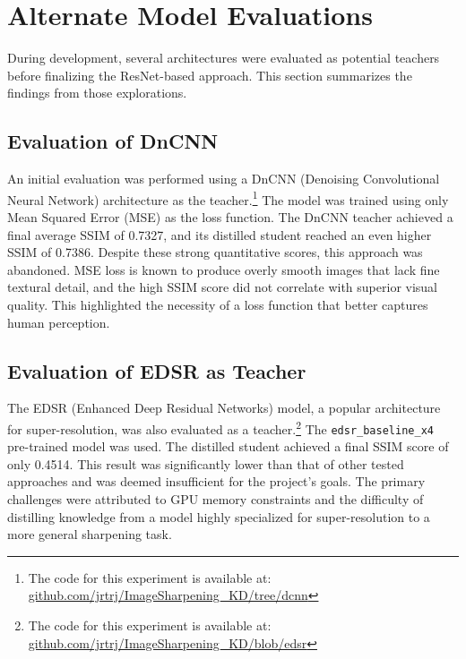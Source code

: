 \documentclass[12pt,a4paper]{article}
\begin{document}
\newpage
\section{Alternate Model Evaluations}
During development, several architectures were evaluated as potential teachers before finalizing the ResNet-based approach. This section summarizes the findings from those explorations.

\subsection{Evaluation of DnCNN}
An initial evaluation was performed using a DnCNN (Denoising Convolutional Neural Network) architecture as the teacher.\footnote{The code for this experiment is available at: \href{https://github.com/jrtrj/ImageSharpening_KD/tree/dcnn}{github.com/jrtrj/ImageSharpening\_KD/tree/dcnn}} The model was trained using only Mean Squared Error (MSE) as the loss function. The DnCNN teacher achieved a final average SSIM of 0.7327, and its distilled student reached an even higher SSIM of 0.7386. Despite these strong quantitative scores, this approach was abandoned. MSE loss is known to produce overly smooth images that lack fine textural detail, and the high SSIM score did not correlate with superior visual quality. This highlighted the necessity of a loss function that better captures human perception.

\subsection{Evaluation of EDSR as Teacher}
The EDSR (Enhanced Deep Residual Networks) model, a popular architecture for super-resolution, was also evaluated as a teacher.\footnote{The code for this experiment is available at: \href{https://github.com/jrtrj/ImageSharpening_KD/blob/edsr/image_sharpening_using_edsr.ipynb}{github.com/jrtrj/ImageSharpening\_KD/blob/edsr}} The \texttt{edsr\_baseline\_x4} pre-trained model was used. The distilled student achieved a final SSIM score of only 0.4514. This result was significantly lower than that of other tested approaches and was deemed insufficient for the project's goals. The primary challenges were attributed to GPU memory constraints and the difficulty of distilling knowledge from a model highly specialized for super-resolution to a more general sharpening task.
\end{document}
